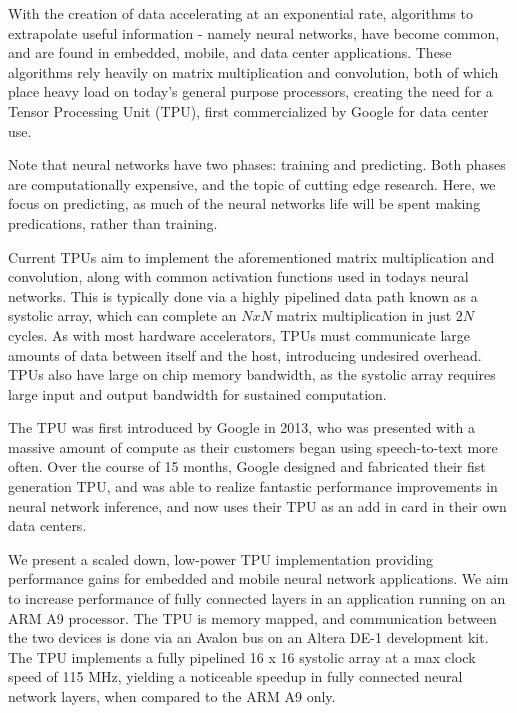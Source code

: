 \documentclass[11pt, conference, onecolumn]{IEEEtran}
\begin{document}
    With the creation of data accelerating at an exponential rate, algorithms to
    extrapolate useful information - namely neural networks, have become
    common, and are found in embedded, mobile, and data center applications. These
    algorithms rely heavily on matrix multiplication and convolution, both of which place
    heavy load on today's general purpose processors, creating the need for a Tensor
    Processing Unit (TPU), first commercialized by Google for data center use.

    Note that neural networks have two phases: training and predicting. Both phases are
    computationally expensive, and the topic of cutting edge research. Here, we focus
    on predicting, as much of the neural networks life will be spent making predications,
    rather than training.

    Current TPUs aim to implement the aforementioned matrix multiplication and
    convolution, along with common activation functions used in todays neural networks.
    This is typically done via a highly pipelined data path known as a systolic array,
    which can complete an $N x N$ matrix multiplication in just $2N$ cycles. As with most
    hardware accelerators, TPUs must communicate large amounts of data between itself and
    the host, introducing undesired overhead. TPUs also have large on chip memory
    bandwidth, as the systolic array requires large input and output bandwidth for sustained
    computation.

    The TPU was first introduced by Google in 2013, who was presented with a massive
    amount of compute as their customers began using speech-to-text more often. Over the
    course of 15 months, Google designed and fabricated their fist generation TPU, and
    was able to realize fantastic performance improvements in neural network inference,
    and now uses their TPU as an add in card in their own data centers.

    We present a scaled down, low-power TPU implementation providing performance gains for
    embedded and mobile neural network applications. We aim to increase performance of
    fully connected layers in an application running on an ARM A9 processor. The TPU is
    memory mapped, and communication between the two devices is done via an Avalon bus on
    an Altera DE-1 development kit. The TPU implements a fully pipelined 16 x 16 systolic
    array at a max clock speed of 115 MHz, yielding a noticeable speedup in
    fully connected neural network layers, when compared to the ARM A9 only.
\end{document}
